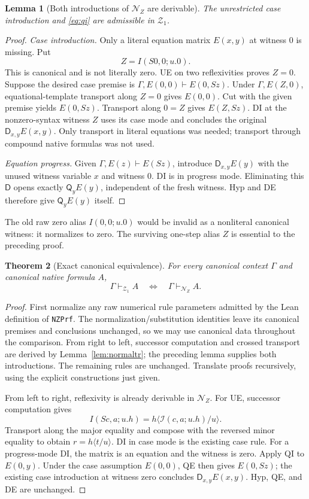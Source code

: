 \documentclass[11pt]{article}
\newtheorem{theorem}{Theorem}[section]
\newtheorem{lemma}[theorem]{Lemma}
\theoremstyle{definition}\newtheorem{definition}[theorem]{Definition}
\newcommand{\Zone}{\mathcal Z_1}
\newcommand{\Q}{\mathsf Q}
\newcommand{\D}{\mathsf D}
\newcommand{\sI}{\mathcal I}
\begin{document}
\begin{lemma}[Both introductions of $\mathcal N_Z$ are derivable]
The unrestricted case introduction and \eqref{eq:qi} are admissible in
$\Zone$.
\end{lemma}
\begin{proof}
\emph{Case introduction.} Only a literal equation matrix $E(x,y)$ at
witness $0$ is missing. Put
\[
 Z=I(S0,0;u.0).
\]
This is canonical and is not literally zero. UE on two reflexivities
proves $Z=0$. Suppose the desired case premise is
$\Gamma,E(0,0)\vdash E(0,Sz)$.
Under $\Gamma,E(Z,0)$, equational-template transport along $Z=0$
gives $E(0,0)$. Cut with the given premise yields $E(0,Sz)$.
Transport along $0=Z$ gives $E(Z,Sz)$. DI at the nonzero-syntax witness
$Z$ uses its case mode and concludes the original $\D_{x,y}E(x,y)$.
Only transport in literal equations was needed; transport through
compound native formulas was not used.

\emph{Equation progress.} Given $\Gamma,E(z)\vdash E(Sz)$, introduce
$\D_{x,y}E(y)$ with the unused witness variable $x$ and witness $0$.
DI is in progress mode. Eliminating this $\D$ opens exactly
$\Q_yE(y)$, independent of the fresh witness. Hyp and DE therefore
give $\Q_yE(y)$ itself.
\end{proof}
The old raw zero alias $I(0,0;u.0)$ would be invalid as a nonliteral
canonical witness: it normalizes to zero. The surviving one-step alias
$Z$ is essential to the preceding proof.

\begin{theorem}[Exact canonical equivalence]\label{thm:canonical}
For every canonical context $\Gamma$ and canonical native formula $A$,
\[
 \Gamma\vdash_{\Zone}A
 \quad\Longleftrightarrow\quad
 \Gamma\vdash_{\mathcal N_Z}A.
\]
\end{theorem}
\begin{proof}
First normalize any raw numerical rule parameters admitted by the Lean
definition of \texttt{NZPrf}. The normalization/substitution identities
leave its canonical premises and conclusions unchanged, so we may use
canonical data throughout the comparison. From right to left, successor computation and crossed transport are
derived by Lemma~\ref{lem:normaltr}; the preceding lemma supplies both
introductions. The remaining rules are unchanged. Translate proofs
recursively, using the explicit constructions just given.

From left to right, reflexivity is already derivable in $\mathcal N_Z$.
For UE, successor computation gives
\[
 I(Sc,a;u.h)=h\langle\sI(c,a;u.h)/u\rangle.
\]
Transport along the major equality and compose with the reversed minor
equality to obtain $r=h\langle t/u\rangle$.
DI in case mode is the existing case rule. For a progress-mode DI,
the matrix is an equation and the witness is zero. Apply QI to
$E(0,y)$. Under the case assumption $E(0,0)$, QE then gives
$E(0,Sz)$; the existing case introduction at witness zero concludes
$\D_{x,y}E(x,y)$. Hyp, QE, and DE are unchanged.
\end{proof}
\end{document}

